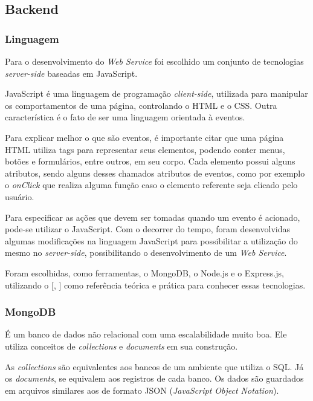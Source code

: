 \documentclass[
	12pt,				%
	oneside,			%
	a4paper,			%
	brazil				%
]{abntex2}
\newcommand{\citecustom}[1]{[\citeauthoronline{#1}, \citeyear{#1}]}
\begin{document}
{\subsection{Backend}

\subsubsection{Linguagem}

Para o desenvolvimento do \textit{Web Service} foi escolhido um conjunto de tecnologias \textit{server-side} baseadas em JavaScript.


JavaScript é uma linguagem de programação \textit{client-side}, utilizada para manipular os comportamentos de uma página, controlando o HTML e o CSS. Outra característica é o fato de ser uma linguagem orientada à eventos.

Para explicar melhor o que são eventos, é importante citar que uma página HTML utiliza tags para representar seus elementos, podendo conter menus, botões e formulários, entre outros, em seu corpo. Cada elemento possui alguns atributos, sendo alguns desses chamados atributos de eventos, como por exemplo o \textit{onClick} que realiza alguma função caso o elemento referente seja clicado pelo usuário.

Para especificar as ações que devem ser tomadas quando um evento é acionado, pode-se utilizar o JavaScript. Com o decorrer do tempo, foram desenvolvidas algumas modificações na linguagem JavaScript para possibilitar a utilização do mesmo no \textit{server-side}, possibilitando o desenvolvimento de um \textit{Web Service}. 

Foram escolhidas, como ferramentas, o MongoDB, o Node.js e o Express.js, utilizando o \citecustom{Almeida2016} como referência teórica e prática para conhecer essas tecnologias.

\subsubsection{MongoDB}

É um banco de dados não relacional com uma escalabilidade muito boa. Ele utiliza conceitos de \textit{collections} e \textit{documents} em sua construção. 

As \textit{collections} são equivalentes aos bancos de um ambiente que utiliza o SQL. Já os \textit{documents}, se equivalem aos registros de cada banco. Os dados são guardados em arquivos similares aos de formato JSON (\textit{JavaScript Object Notation}).

}
\end{document}
